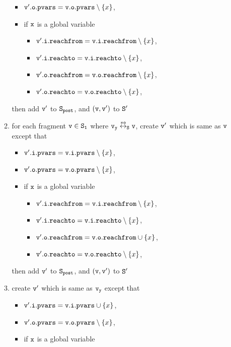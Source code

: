 \begin{itemize}
\begin{enumerate}
\begin{itemize}
\item $\mathtt{v}'.\mathtt{o}.\mathtt{pvars} = \mathtt{v}.\mathtt{o}.\mathtt{pvars} \setminus \left\{x\right\}$,
\item if $\tt x$ is a global variable
\begin{itemize}
\item $\mathtt{v}'.\mathtt{i}.\mathtt{reachfrom} = \mathtt{v}.\mathtt{i}.\mathtt{reachfrom} \setminus \left\{x\right\}$,
\item $\mathtt{v}'.\mathtt{i}.\mathtt{reachto} = \mathtt{v}.\mathtt{i}.\mathtt{reachto} \setminus \left\{x\right\}$,
\item $\mathtt{v}'.\mathtt{o}.\mathtt{reachfrom} = \mathtt{v}.\mathtt{o}.\mathtt{reachfrom} \setminus \left\{x\right\}$,
\item $\mathtt{v}'.\mathtt{o}.\mathtt{reachto} = \mathtt{v}.\mathtt{o}.\mathtt{reachto} \setminus \left\{x\right\}$,
\end{itemize}
\end{itemize}
then add $\tt v'$ to $\tt S_{post}$, and $\tt (v,v')$ to $\tt S'$
\item for each fragment $\tt v \in S_1$ where $\tt v_y \overset{*o}\leftrightarrow_S v$, create $\tt v'$ which is same as $\tt v$ except that
\begin{itemize}
\item $\mathtt{v}'.\mathtt{i}.\mathtt{pvars} = \mathtt{v}.\mathtt{i}.\mathtt{pvars} \setminus \left\{x\right\}$,
\item $\mathtt{v}'.\mathtt{o}.\mathtt{pvars} = \mathtt{v}.\mathtt{o}.\mathtt{pvars} \setminus \left\{x\right\}$,
\item if $\tt x$ is a global variable
\begin{itemize}
\item $\mathtt{v}'.\mathtt{i}.\mathtt{reachfrom} = \mathtt{v}.\mathtt{i}.\mathtt{reachfrom} \setminus \left\{x\right\}$,
\item $\mathtt{v}'.\mathtt{i}.\mathtt{reachto} = \mathtt{v}.\mathtt{i}.\mathtt{reachto} \setminus \left\{x\right\}$,
\item $\mathtt{v}'.\mathtt{o}.\mathtt{reachfrom} = \mathtt{v}.\mathtt{o}.\mathtt{reachfrom} \cup \left\{x\right\}$,
\item $\mathtt{v}'.\mathtt{o}.\mathtt{reachto} = \mathtt{v}.\mathtt{o}.\mathtt{reachto} \setminus \left\{x\right\}$,
\end{itemize}
\end{itemize}
then add $\tt v'$ to $\tt S_{post}$, and $\tt (v,v')$ to $\tt S'$
\item create $\tt v'$ which is same as $\tt v_y$ except that
\begin{itemize}
\item $\mathtt{v}'.\mathtt{i}.\mathtt{pvars} = \mathtt{v}.\mathtt{i}.\mathtt{pvars} \cup \left\{x\right\}$,
\item $\mathtt{v}'.\mathtt{o}.\mathtt{pvars} = \mathtt{v}.\mathtt{o}.\mathtt{pvars} \setminus \left\{x\right\}$,
\item if $\tt x$ is a global variable

\end{itemize}
\end{enumerate}
\end{itemize}
